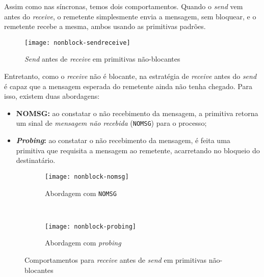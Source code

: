 Assim como nas síncronas, temos dois comportamentos. Quando o \textit{send} vem antes do \textit{receive}, o remetente simplesmente envia a mensagem, sem bloquear, e o remetente recebe a mesma, ambos usando as primitivas padrões.

\begin{figure}[ht]
  \centering
  \texttt{[image: nonblock-sendreceive]}
  \caption{\textit{Send} antes de \textit{receive} em primitivas não-blocantes}
  \label{fig:nonblock-sendreceive}
\end{figure}

Entretanto, como o \textit{receive} não é blocante, na estratégia de \textit{receive} antes do \textit{send} é capaz que a mensagem esperada do remetente ainda não tenha chegado. Para isso, existem duas abordagens:

\begin{itemize}
  \item \textbf{NOMSG:} ao constatar o não recebimento da mensagem, a primitiva retorna um sinal de \textit{mensagem não recebida} (\texttt{NOMSG}) para o processo;

  \item \textbf{\textit{Probing}:} ao constatar o não recebimento da mensagem, é feita uma primitiva que requisita a mensagem ao remetente, acarretando no bloqueio do destinatário. %
\end{itemize}

\begin{figure*}[ht]
  \begin{subfigure}{0.5\textwidth}
    \centering
    \texttt{[image: nonblock-nomsg]}
    \caption{Abordagem com \texttt{NOMSG}}
    \label{subfig:nonblock-nomsg}
  \end{subfigure}
  ~
  \begin{subfigure}{0.5\textwidth}
    \centering
    \texttt{[image: nonblock-probing]}
    \caption{Abordagem com \textit{probing}}
    \label{subfig:nonblock-probing}
  \end{subfigure}

  \caption{Comportamentos para \textit{receive} antes de \textit{send} em primitivas não-blocantes}
  \label{fig:messages-nonblock}
\end{figure*}
